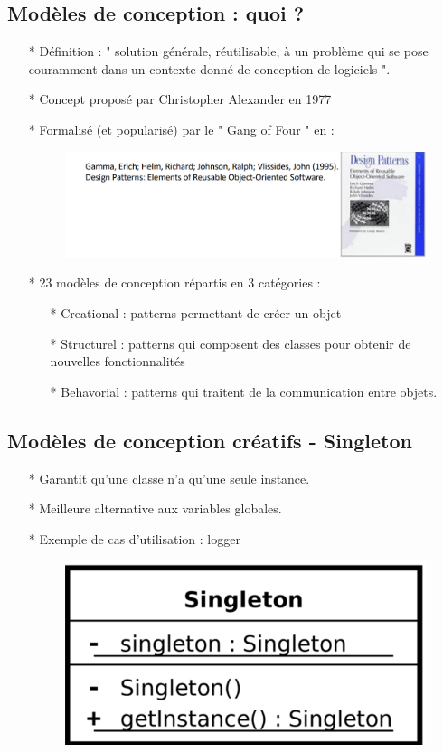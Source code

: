 \documentclass[12pt]{article}
\begin{document}
\subsection{Modèles de conception : quoi ?}
\begin{itemize}
	\item[* ] Définition : " solution générale, réutilisable, à un problème qui se pose couramment
	dans un contexte donné de conception de logiciels ".
	\item[* ] Concept proposé par Christopher Alexander en 1977
	\item[* ] Formalisé (et popularisé) par le " Gang of Four " en : 
		\begin{figure}[!hbtp]
		\centering
		\includegraphics[scale=0.75]{Capture.PNG}
	\end{figure}
\item[* ] 23 modèles de conception répartis en 3 catégories :
\begin{itemize}
	\item[* ] Creational : patterns permettant de créer un objet
	\item[* ] Structurel : patterns qui composent des classes pour obtenir de nouvelles fonctionnalités
	\item[* ] Behavorial : patterns qui traitent de la communication entre objets.
\end{itemize}
\end{itemize}
\subsection{Modèles de conception créatifs - Singleton}
\begin{itemize}
	\item[* ] Garantit qu'une classe n'a qu'une seule instance.
	\item[* ] Meilleure alternative aux variables globales.
	\item[* ] Exemple de cas d'utilisation : logger
	\begin{figure}[!hbtp]
		\centering
		\includegraphics[scale=0.75]{Capture1.PNG}
	\end{figure}
\end{itemize}
\end{document}
